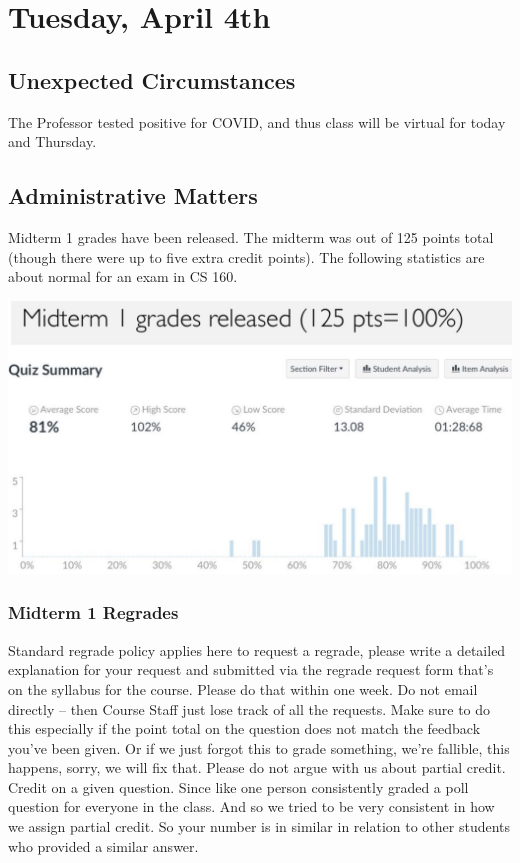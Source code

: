 \section{Tuesday, April 4th}
\subsection{Unexpected Circumstances}
The Professor tested positive for COVID, and thus class will be virtual for today and Thursday.

\subsection{Administrative Matters}
Midterm 1 grades have been released. The midterm was out of 125 points total (though there were up to five extra credit points). The following statistics are about normal for an exam in CS 160.
\begin{center}
    \includegraphics[scale=0.25]
    {lectures/wk11/img/midterm_grades.png}
\end{center}

\subsubsection{Midterm 1 Regrades}
Standard regrade policy applies here to request a regrade, please write a detailed explanation for your request and submitted via the regrade request form that's on the syllabus for the course. Please do that within one week. Do not email directly -- then Course Staff just lose track of all the requests. Make sure to do this especially if the point total on the question does not match the feedback you've been given. Or if we just forgot this to grade something, we're fallible, this happens, sorry, we will fix that. Please do not argue with us about partial credit. Credit on a given question. Since like one person consistently graded a poll question for everyone in the class. And so we tried to be very consistent in how we assign partial credit. So your number is in similar in relation to other students who provided a similar answer. 

